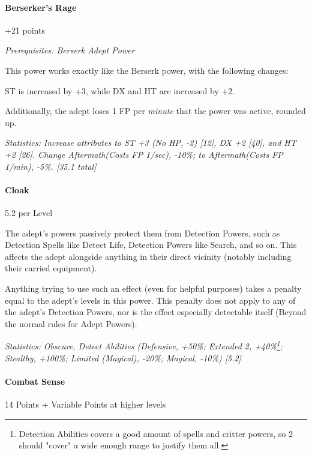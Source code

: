 \begin{multicols*}{3}
			
	\paragraph{Berserker's Rage}
	\begin{flushright}
		+21 points
	\end{flushright}
	\begin{flushright}
	\textit{Prerequisites: Berserk Adept Power}
	\end{flushright}
	
	This power works exactly like the Berserk power, with the following changes:
	
	ST is increased by +3, while DX and HT are increased by +2.
	
	Additionally, the adept loses 1 FP per \textit{minute} that the power was active, rounded up.
	
	\textcolor{OliveGreen}{\textit{Statistics: Increase attributes to ST +3 (No HP, -2) [12], DX +2 [40], and HT +2 [26]. Change Aftermath(Costs FP 1/sec), -10\%; to Aftermath(Costs FP 1/min), -5\%. [35.1 total] }}
	
	
	\paragraph{Cloak}
	\begin{flushright}
	 5.2 per Level
	\end{flushright}

	The adept's powers passively protect them from Detection Powers, such as Detection Spells like Detect Life, Detection Powers like Search, and so on. This affects the adept alongside anything in their direct vicinity (notably including their carried equipment).
	
	Anything trying to use such an effect (even for helpful purposes) takes a penalty equal to the adept's levels in this power. This penalty does not apply to any of the adept's Detection Powers, nor is the effect especially detectable itself (Beyond the normal rules for Adept Powers).

	\textcolor{OliveGreen}{\textit{Statistics: Obscure, Detect Abilities (Defensive, +50\%; Extended 2, +40\%\footnote{Detection Abilities covers a good amount of spells and critter powers, so 2 should "cover" a wide enough range to justify them all.}; Stealthy, +100\%; Limited (Magical), -20\%; Magical, -10\%) [5.2]}}
	
	\paragraph{Combat Sense}
	\begin{flushright}
		14 Points + Variable Points at higher levels
	\end{flushright}


\end{multicols*}
